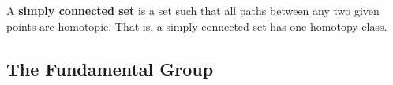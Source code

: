   \begin{definition}
    A \textbf{simply connected set} is a set such that all paths between any two given points are homotopic. That is, a simply connected set has one homotopy class. 
  \end{definition}

\subsection{The Fundamental Group}

